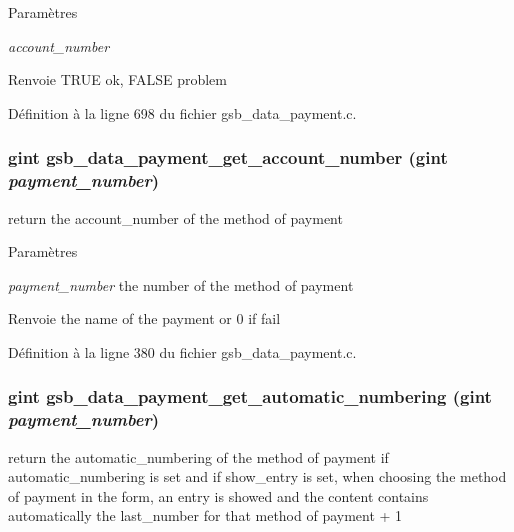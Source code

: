 \begin{DoxyParams}{Paramètres}
\item[{\em account\_\-number}]\end{DoxyParams}
\begin{DoxyReturn}{Renvoie}
TRUE ok, FALSE problem 
\end{DoxyReturn}


Définition à la ligne 698 du fichier gsb\_\-data\_\-payment.c.

\subsubsection[{gsb\_\-data\_\-payment\_\-get\_\-account\_\-number}]{\setlength{\rightskip}{0pt plus 5cm}gint gsb\_\-data\_\-payment\_\-get\_\-account\_\-number (gint {\em payment\_\-number})}\label{gsb__data__payment_8c_a02601e83e3a7796d9fc863077dd91627}
return the account\_\-number of the method of payment


\begin{DoxyParams}{Paramètres}
\item[{\em payment\_\-number}]the number of the method of payment\end{DoxyParams}
\begin{DoxyReturn}{Renvoie}
the name of the payment or 0 if fail 
\end{DoxyReturn}


Définition à la ligne 380 du fichier gsb\_\-data\_\-payment.c.

\subsubsection[{gsb\_\-data\_\-payment\_\-get\_\-automatic\_\-numbering}]{\setlength{\rightskip}{0pt plus 5cm}gint gsb\_\-data\_\-payment\_\-get\_\-automatic\_\-numbering (gint {\em payment\_\-number})}\label{gsb__data__payment_8c_adcfc32426d570e071cb397b7a20e5988}
return the automatic\_\-numbering of the method of payment if automatic\_\-numbering is set and if show\_\-entry is set, when choosing the method of payment in the form, an entry is showed and the content contains automatically the last\_\-number for that method of payment + 1


